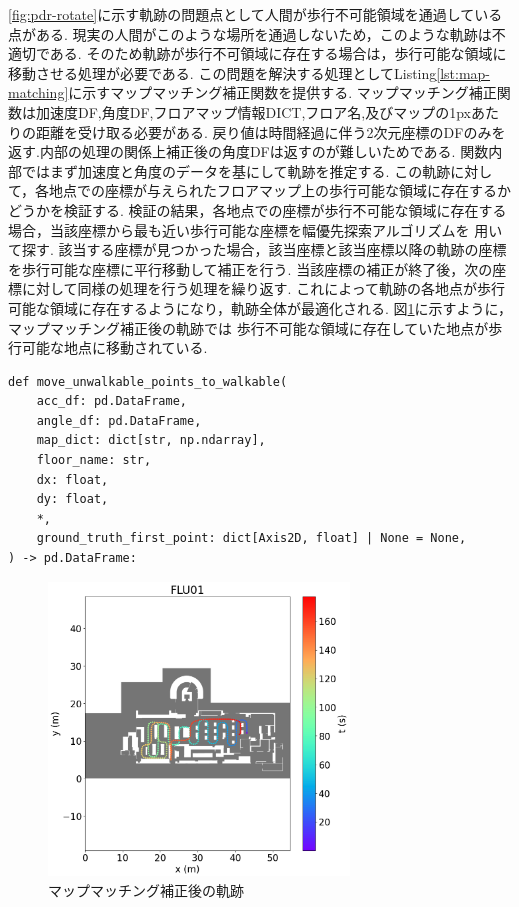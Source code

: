 
\ref{fig:pdr-rotate}に示す軌跡の問題点として人間が歩行不可能領域を通過している点がある.
現実の人間がこのような場所を通過しないため，このような軌跡は不適切である.
そのため軌跡が歩行不可領域に存在する場合は，歩行可能な領域に移動させる処理が必要である.
この問題を解決する処理としてListing\ref{lst:map-matching}に示すマップマッチング補正関数を提供する.
マップマッチング補正関数は加速度DF,角度DF,フロアマップ情報DICT,フロア名,及びマップの1pxあたりの距離を受け取る必要がある.
戻り値は時間経過に伴う2次元座標のDFのみを返す.内部の処理の関係上補正後の角度DFは返すのが難しいためである.
関数内部ではまず加速度と角度のデータを基にして軌跡を推定する.
この軌跡に対して，各地点での座標が与えられたフロアマップ上の歩行可能な領域に存在するかどうかを検証する.
検証の結果，各地点での座標が歩行不可能な領域に存在する場合，当該座標から最も近い歩行可能な座標を幅優先探索アルゴリズムを
用いて探す.
該当する座標が見つかった場合，該当座標と該当座標以降の軌跡の座標を歩行可能な座標に平行移動して補正を行う.
当該座標の補正が終了後，次の座標に対して同様の処理を行う処理を繰り返す.
これによって軌跡の各地点が歩行可能な領域に存在するようになり，軌跡全体が最適化される.
図\ref{fig:map-matching}に示すように，マップマッチング補正後の軌跡では
歩行不可能な領域に存在していた地点が歩行可能な地点に移動されている.

\begin{lstlisting}[caption={マップマッチング補正}, label=lst:map-matching]
def move_unwalkable_points_to_walkable(
    acc_df: pd.DataFrame,
    angle_df: pd.DataFrame,
    map_dict: dict[str, np.ndarray],
    floor_name: str,
    dx: float,
    dy: float,
    *,
    ground_truth_first_point: dict[Axis2D, float] | None = None,
) -> pd.DataFrame:

\end{lstlisting}

\begin{figure}[h]
	\centering
	\includegraphics[width=80mm]{image/map-matching.png}
	\caption{マップマッチング補正後の軌跡}    \label{fig:map-matching}
\end{figure}

